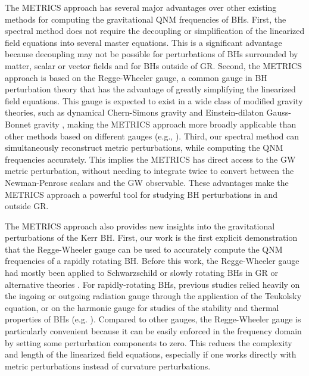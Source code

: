 \documentclass[aps,prx,amsmath,floats,floatfix,twocolumn,
  superscriptaddress,nofootinbib,showpacs]{revtex4-1}
\begin{document}
The METRICS approach has several major advantages over other existing methods for computing the gravitational QNM frequencies of BHs.
First, the spectral method does not require the decoupling or simplification of the linearized field equations into several master equations. 
This is a significant advantage because decoupling may not be possible for perturbations of BHs surrounded by matter, scalar or vector fields and for BHs outside of GR.
Second, the METRICS approach is based on the Regge-Wheeler gauge, a common gauge in BH perturbation theory that has the advantage of greatly simplifying the linearized field equations.
This gauge is expected to exist in a wide class of modified gravity theories, such as dynamical Chern-Simons gravity \cite{QNM_dCS_01, QNM_dCS_02, QNM_dCS_03, QNM_dCS_04} and Einstein-dilaton Gauss-Bonnet gravity \cite{QNM_EdGB_01, QNM_EdGB_02, QNM_EdGB_03}, making the METRICS approach more broadly applicable than other methods based on different gauges (e.g., \cite{Dolan:2021ijg, Ripley:2020xby, Loutrel_Ripley_Giorgi_Pretorius_2020, Spectral_04, Spectral_05, Spectral_06, Dias:2014eua, Dias:2013sdc, Santos:2015iua, Dias:2015nua}).
Third, our spectral method can simultaneously reconstruct metric perturbations, while computing the QNM frequencies accurately. 
This implies the METRICS has direct access to the GW metric perturbation, without needing to integrate twice to convert between the Newman-Penrose scalars and the GW observable. 
These advantages make the METRICS approach a powerful tool for studying BH perturbations in and outside GR. 

The METRICS approach also provides new insights into the gravitational perturbations of the Kerr BH.
First, our work is the first explicit demonstration that the Regge-Wheeler gauge can be used to accurately compute the QNM frequencies of a rapidly rotating BH. 
Before this work, the Regge-Wheeler gauge had mostly been applied to Schwarzschild or slowly rotating BHs in GR or alternative theories \cite{QNM_dCS_01, QNM_EdGB_02, QNM_EdGB_03}. 
For rapidly-rotating BHs, previous studies relied heavily on the ingoing or outgoing radiation gauge through the application of the Teukolsky equation, or on the harmonic gauge for studies of the stability and thermal properties of BHs (e.g. \cite{Santos:2015iua, Monteiro:2009ke, Dias:2009iu, Dias:2010eu, Dias:2013sdc, Dias:2014eua, Dias:2015nua, Dias:2015wqa, Dias:2018ufh, Dias:2021yju, Dias:2022oqm, Dias:2022str}). 
Compared to other gauges, the Regge-Wheeler gauge is particularly convenient because it can be easily enforced in the frequency domain by setting some perturbation components to zero. 
This reduces the complexity and length of the linearized field equations, especially if one works directly with metric perturbations instead of curvature perturbations. 
\end{document}
